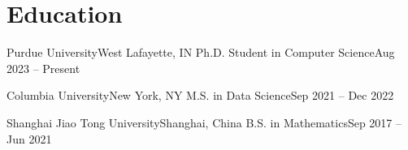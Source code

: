 \section{Education}

\begin{resumeEntries}
  \resumeEntry
    {Purdue University}{West Lafayette, IN}
    {Ph.D. Student in Computer Science}{Aug 2023 -- Present}

  \resumeEntry
    {Columbia University}{New York, NY}
    {M.S. in Data Science}{Sep 2021 -- Dec 2022}

  \resumeEntry
    {Shanghai Jiao Tong University}{Shanghai, China}
    {B.S. in Mathematics}{Sep 2017 -- Jun 2021}
\end{resumeEntries}

